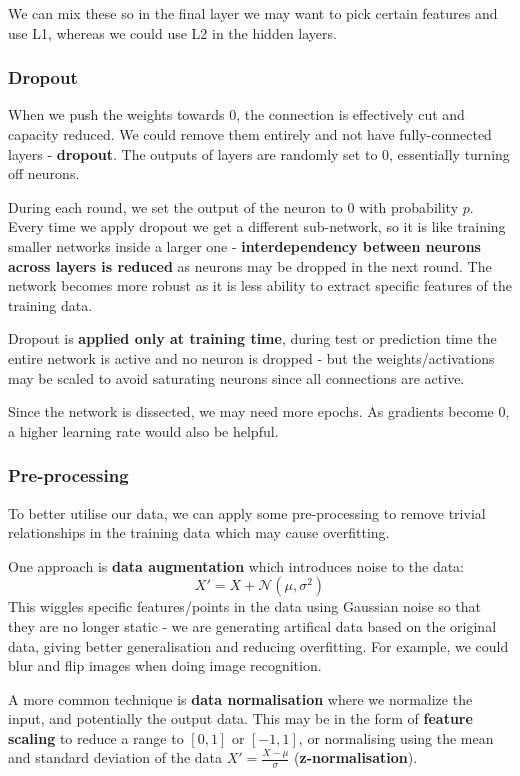 \documentclass[11pt]{article}
\begin{document}
We can mix these so in the final layer we may want to pick certain features and use L1, whereas we could use L2 in the hidden layers.

\subsubsection{Dropout}
When we push the weights towards 0, the connection is effectively cut and capacity reduced.
We could remove them entirely and not have fully-connected layers - \textbf{dropout}.
The outputs of layers are randomly set to 0, essentially turning off neurons.

During each round, we set the output of the neuron to 0 with probability $p$.
Every time we apply dropout we get a different sub-network, so it is like training smaller networks inside a larger one - \textbf{interdependency between neurons across layers is reduced} as neurons may be dropped in the next round.
The network becomes more robust as it is less ability to extract specific features of the training data.

Dropout is \textbf{applied only at training time}, during test or prediction time the entire network is active and no neuron is dropped - but the weights/activations may be scaled to avoid saturating neurons since all connections are active.

Since the network is dissected, we may need more epochs.
As gradients become 0, a higher learning rate would also be helpful.

\subsubsection{Pre-processing}
To better utilise our data, we can apply some pre-processing to remove trivial relationships in the training data which may cause overfitting.

One approach is \textbf{data augmentation} which introduces noise to the data:
\[
  X' = X + \mathcal{N}(\mu, \sigma^2) 
\]
This wiggles specific features/points in the data using Gaussian noise so that they are no longer static - we are generating artifical data based on the original data, giving better generalisation and reducing overfitting.
For example, we could blur and flip images when doing image recognition.

A more common technique is \textbf{data normalisation} where we normalize the input, and potentially the output data.
This may be in the form of \textbf{feature scaling} to reduce a range to $[0, 1]$ or $[-1, 1]$, or normalising using the mean and standard deviation of the data $X' = \frac{X - \mu}{\sigma}$ (\textbf{z-normalisation}).
\end{document}
